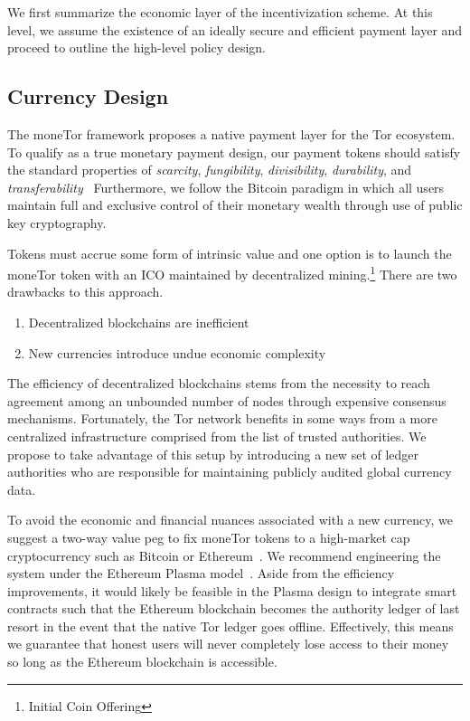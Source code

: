 We first summarize the economic layer of the incentivization scheme. At this
level, we assume the existence of an ideally secure and efficient payment layer
and proceed to outline the high-level policy design.

\subsection{Currency Design}

The moneTor framework proposes a native payment layer for the Tor ecosystem. To
qualify as a true monetary payment design, our payment tokens should satisfy the
standard properties of \textit{scarcity}, \textit{fungibility},
\textit{divisibility}, \textit{durability}, and
\textit{transferability}~\cite[p.3]{crump2011phenomenon} Furthermore, we follow
the Bitcoin paradigm in which all users maintain full and exclusive control of
their monetary wealth through use of public key cryptography.

Tokens must accrue some form of intrinsic value and one option is to launch the
moneTor token with an ICO maintained by decentralized mining.\footnote{Initial
  Coin Offering} There are two drawbacks to this approach.

\begin{enumerate}
\item Decentralized blockchains are inefficient
\item New currencies introduce undue economic complexity
\end{enumerate}

The efficiency of decentralized blockchains stems from the necessity to reach
agreement among an unbounded number of nodes through expensive consensus
mechanisms. Fortunately, the Tor network benefits in some ways from a more
centralized infrastructure comprised from the list of trusted authorities. We
propose to take advantage of this setup by introducing a new set of ledger
authorities who are responsible for maintaining publicly audited global
currency data.

To avoid the economic and financial nuances associated with a new currency, we
suggest a two-way value peg to fix moneTor tokens to a high-market cap
cryptocurrency such as Bitcoin or Ethereum~\cite{back2014enabling,
  poon2017plasma}. We recommend engineering the system under the Ethereum Plasma
model~\cite{poon2017plasma}. Aside from the efficiency improvements, it would
likely be feasible in the Plasma design to integrate smart contracts such that
the Ethereum blockchain becomes the authority ledger of last resort in the event
that the native Tor ledger goes offline. Effectively, this means we guarantee
that honest users will never completely lose access to their money so long as
the Ethereum blockchain is accessible.

